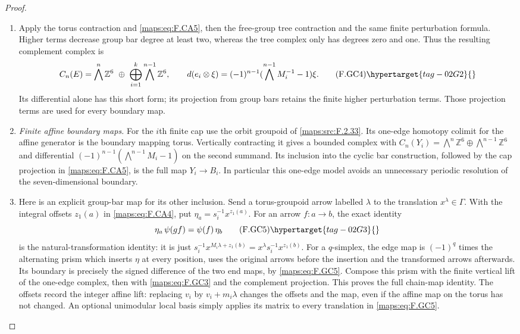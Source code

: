 \begin{proof}
\begin{enumerate}[label={$\langle1\rangle$\arabic*.}]
\item Apply the torus contraction and \eqref{maps:eq:F.CA5}, then the free-group
tree contraction and the same finite perturbation formula.
Higher terms decrease group bar degree at least two, whereas
the tree complex only has degrees zero and one.  Thus the
resulting complement complex is
\[
 C_n(E)=\bigwedge^n\mathbb Z^6\ \oplus\
 \bigoplus_{i=1}^k\bigwedge^{n-1}\mathbb Z^6,
 \qquad
 d(e_i\otimes\xi)=(-1)^{n-1}
   (\bigwedge^{n-1}M_i^{-1}-1)\xi.                         \tag{F.GC4}\hypertarget{tag-02G2}{}\label{maps:eq:F.GC4}
\]
Its differential alone has this short form; its projection
from group bars retains the finite higher perturbation terms.
Those projection terms are used for every boundary map.

\item \emph{Finite affine boundary maps.}
For the $i$th finite cap use the orbit groupoid of \ref{maps:src:F.2.33}.
Its one-edge homotopy colimit for the affine generator is
the boundary mapping torus.  Vertically contracting it gives
a bounded complex with
$C_n(Y_i)=\bigwedge^n\mathbb Z^6\oplus
\bigwedge^{n-1}\mathbb Z^6$ and differential
$(-1)^{n-1}(\bigwedge^{n-1}M_i-1)$ on the second summand.
Its inclusion into the cyclic bar construction, followed by
the cap projection in \eqref{maps:eq:F.CA5}, is the full map $Y_i\to B_i$.
In particular this one-edge model avoids an unnecessary
periodic resolution of the seven-dimensional boundary.

\item Here is an explicit group-bar map for its other inclusion.
Send a torus-groupoid arrow labelled $\lambda$ to the
translation $x^\lambda\in\Gamma$.  With the integral offsets
$z_1(a)$ in \eqref{maps:eq:F.CA4}, put
$\eta_a=s_i^{-1}x^{z_1(a)}$.
For an arrow $f:a\to b$, the exact identity
\[
 \eta_a\,\psi(gf)=\psi(f)\,\eta_b                        \tag{F.GC5}\hypertarget{tag-02G3}{}\label{maps:eq:F.GC5}
\]
is the natural-transformation identity: it is just
$s_i^{-1}x^{M_i\lambda+z_1(b)}
 =x^\lambda s_i^{-1}x^{z_1(b)}$.
For a $q$-simplex, the edge map is $(-1)^q$ times the
alternating prism which inserts $\eta$ at every position,
uses the original arrows before the insertion and the
transformed arrows afterwards.  Its boundary is precisely
the signed difference of the two end maps, by \eqref{maps:eq:F.GC5}.
Compose this prism with the finite vertical lift of the
one-edge complex, then with \eqref{maps:eq:F.GC3} and the complement
projection.  This proves the full chain-map identity.
The offsets record the integer affine lift: replacing
$v_i$ by $v_i+m_i\lambda$ changes the offsets and the map,
even if the affine map on the torus has not changed.
An optional unimodular local basis simply applies its matrix
to every translation in \eqref{maps:eq:F.GC5}.


\end{enumerate}
\end{proof}
